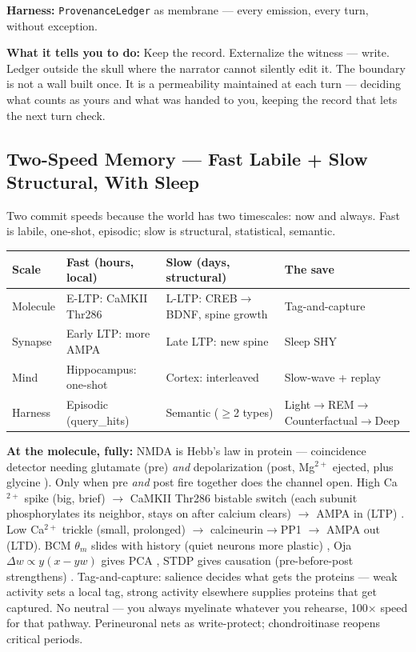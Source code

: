 \documentclass[11pt]{article}
\begin{document}
\textbf{Harness:} \texttt{ProvenanceLedger} as membrane --- every emission, every turn, without exception.

\textbf{What it tells you to do:} Keep the record. Externalize the witness --- write. Ledger outside the skull where the narrator cannot silently edit it. The boundary is not a wall built once. It is a permeability maintained at each turn --- deciding what counts as yours and what was handed to you, keeping the record that lets the next turn check.

\subsection{Two-Speed Memory --- Fast Labile + Slow Structural, With Sleep}

Two commit speeds because the world has two timescales: now and always. Fast is labile, one-shot, episodic; slow is structural, statistical, semantic.

\begin{center}
\small
\begin{tabular}{p{2.2cm}p{3.5cm}p{3.5cm}p{2.5cm}}
\toprule
Scale & Fast (hours, local) & Slow (days, structural) & The save \\
\midrule
Molecule & E-LTP: CaMKII Thr286 & L-LTP: CREB$\to$\allowbreak{}BDNF, spine growth & Tag-and-capture \\
Synapse & Early LTP: more AMPA & Late LTP: new spine & Sleep SHY \\
Mind & Hippocampus: one-shot & Cortex: interleaved & Slow-wave + replay \\
Harness & Episodic (query\_hits) & Semantic ($\geq$2 types) & Light$\to$\allowbreak{}REM$\to$\allowbreak{}Counter\-factual$\to$\allowbreak{}Deep \\
\bottomrule
\end{tabular}
\end{center}

\textbf{At the molecule, fully:} NMDA is Hebb's law in protein --- coincidence detector needing glutamate (pre) \emph{and} depolarization (post, Mg$^{2+}$ ejected, plus glycine \citep{tononi2014}). Only when pre \emph{and} post fire together does the channel open. High Ca$^{2+}$ spike (big, brief) $\to$\allowbreak{} CaMKII Thr286 bistable switch (each subunit phosphorylates its neighbor, stays on after calcium clears) $\to$\allowbreak{} AMPA in (LTP) \citep{tononi2014}. Low Ca$^{2+}$ trickle (small, prolonged) $\to$\allowbreak{} calcineurin$\to$\allowbreak{}PP1 $\to$\allowbreak{} AMPA out (LTD). BCM $\theta_m$ slides with history (quiet neurons more plastic) \citep{bienenstock1982}, Oja $\Delta w \propto y(x - yw)$ gives PCA \citep{oja1982}, STDP gives causation (pre-before-post strengthens) \citep{bipoo1998}. Tag-and-capture: salience decides what gets the proteins --- weak activity sets a local tag, strong activity elsewhere supplies proteins that get captured. No neutral --- you always myelinate whatever you rehearse, 100$\times$ speed for that pathway. Perineuronal nets as write-protect; chondroitinase reopens critical periods.
\end{document}

